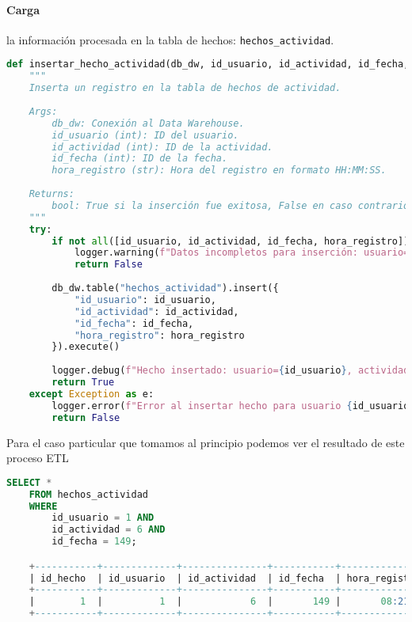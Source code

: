 \paragraph{Carga} la información procesada en la tabla de hechos: \texttt{hechos\_actividad}.

\begin{lstlisting}[language=Python]
    def insertar_hecho_actividad(db_dw, id_usuario, id_actividad, id_fecha, hora_registro):
    """
    Inserta un registro en la tabla de hechos de actividad.
    
    Args:
        db_dw: Conexión al Data Warehouse.
        id_usuario (int): ID del usuario.
        id_actividad (int): ID de la actividad.
        id_fecha (int): ID de la fecha.
        hora_registro (str): Hora del registro en formato HH:MM:SS.
        
    Returns:
        bool: True si la inserción fue exitosa, False en caso contrario.
    """
    try:
        if not all([id_usuario, id_actividad, id_fecha, hora_registro]):
            logger.warning(f"Datos incompletos para inserción: usuario={id_usuario}, actividad={id_actividad}, fecha={id_fecha}")
            return False
            
        db_dw.table("hechos_actividad").insert({
            "id_usuario": id_usuario,
            "id_actividad": id_actividad,
            "id_fecha": id_fecha,
            "hora_registro": hora_registro
        }).execute()
        
        logger.debug(f"Hecho insertado: usuario={id_usuario}, actividad={id_actividad}, fecha={id_fecha}")
        return True
    except Exception as e:
        logger.error(f"Error al insertar hecho para usuario {id_usuario}: {e}")
        return False
\end{lstlisting}

Para el caso particular que tomamos al principio podemos ver el resultado de este proceso ETL

\begin{lstlisting}[language=sql]
    SELECT *
    FROM hechos_actividad
    WHERE
        id_usuario = 1 AND
        id_actividad = 6 AND
        id_fecha = 149;

    +-----------+-------------+---------------+-----------+----------------+
    | id_hecho  | id_usuario  | id_actividad  | id_fecha  | hora_registro  |
    +-----------+-------------+---------------+-----------+----------------+
    |        1  |          1  |            6  |       149 |       08:21:53 |
    +-----------+-------------+---------------+-----------+----------------+
\end{lstlisting}

